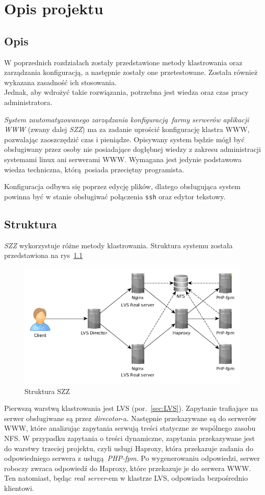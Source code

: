 \chapter{Opis projektu}
\section{Opis}
W poprzednich rozdziałach zostały przedstawione metody klastrowania oraz zarządzania konfiguracją, a następnie zostały one przetestowane.
Została również wykazana zasadność ich stosowania.\\
Jednak, aby wdrożyć takie rozwiązania, potrzebna jest wiedza oraz czas pracy administratora.

\textit{System zautomatyzowanego zarządzania konfiguracją farmy serwerów aplikacji WWW} (zwany dalej \textit{SZZ}) ma za zadanie uprościć konfigurację klastra WWW, pozwalając zaoszczędzić czas i pieniądze.
Opisywany system będzie mógł być obsługiwany przez osoby nie posiadające dogłębnej wiedzy z zakresu administracji systemami linux ani serwerami WWW.
Wymagana jest jedynie podstawowa wiedza techniczna, którą posiada przeciętny programista.

Konfiguracja odbywa się poprzez edycję plików, dlatego obsługująca system powinna być w stanie obsługiwać połączenia \texttt{ssh} oraz edytor tekstowy.
\section{Struktura}
\textit{SZZ} wykorzystuje różne metody klastrowania.
Struktura systemu została przedstawiona na rys~\ref{fig:struktura}
\begin{figure}
	\centering
	\includegraphics[width=\textwidth]{obrazy/struktura_szz.png}
	\caption{Struktura SZZ}
	\label{fig:struktura}
\end{figure}
Pierwszą warstwą klastrowania jest LVS (por.~\ref{sec:LVS}).
Zapytanie trafiające na serwer obsługiwane są przez \textit{direcotor}-a.
Następnie przekazywane są do serwerów WWW, które analizując zapytania serwują treści statyczne ze wspólnego zasobu NFS.
W przypadku zapytania o treści dynamiczne, zapytania przekazywane jest do warstwy trzeciej projektu, czyli usługi Haproxy, która przekazuje zadania do odpowiedniego serwera z usługą \textit{PHP-fpm}.
Po wygenerowaniu odpowiedzi, serwer roboczy zwraca odpowiedź do Haproxy, które przekazuje je do serwera WWW.
Ten natomiast, będąc \textit{real server}-em w klastrze LVS, odpowiada bezpośrednio klientowi.
